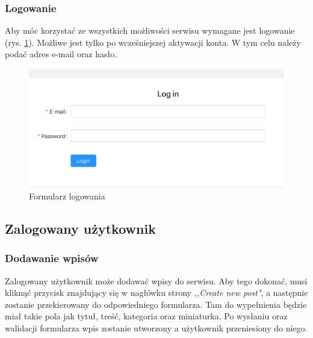 \documentclass[declaration,shortabstract]{iithesis}
\begin{document}
\subsubsection{Logowanie}
Aby móc korzystać ze wszystkich możliwości serwisu wymagane jest logowanie (rys. \ref{fig:login}). Możliwe jest tylko po wcześniejszej aktywacji konta. W tym celu należy podać adres e-mail oraz hasło.

\begin{figure}
    \centering
    \includegraphics[width=\linewidth]{images/logowanie.png}
    \caption{Formularz logowania}
    \label{fig:login}
\end{figure}

\subsection{Zalogowany użytkownik}

\subsubsection{Dodawanie wpisów}
Zalogowany użytkownik może dodawać wpisy do serwisu. Aby tego dokonać, musi kliknąć przycisk znajdujący się w nagłówku strony \textit{,,Create new post"}, a następnie zostanie przekierowany do odpowiedniego formularza. Tam do wypełnienia będzie miał takie pola jak tytuł, treść, kategoria oraz miniaturka. Po wysłaniu oraz walidacji formularza wpis zostanie utworzony a użytkownik przeniesiony do niego.
\end{document}
